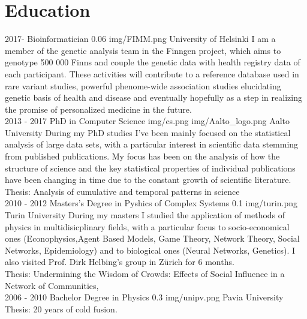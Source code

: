 \documentclass[]{friggeri-cv}
\begin{document}
\section{Education}
\begin{entrylist}
\unientry
{2017-}
{Bioinformatician}
{0.06}
{img/FIMM.png}
{University of Helsinki}
{I am a member of the genetic analysis team in the Finngen project, which aims to genotype 500 000 Finns and couple the genetic data with health registry data of each participant. These activities will contribute to a reference database used in rare variant studies, powerful phenome-wide association studies elucidating genetic basis of health and disease and eventually hopefully as a step in realizing the promise of personalized medicine in the future.}
\\

  \aaltoentry
    {2013 - 2017}
    {PhD in Computer Science}
{img/cs.png}
{img/Aalto_logo.png}
{Aalto University}
{During my PhD studies I've been mainly focused on the statistical analysis of large data sets, with a particular interest in
scientific data stemming from published publications. My focus has been on the analysis of how the structure of science and
the key statistical properties of individual publications have been changing in time due to the constant growth of scientific
literature.\\
Thesis: Analysis of cumulative and temporal patterns in science
}
\\

\unientry
    {2010 - 2012}
    {Masters's Degree in Pyshics of Complex Systems}
    {0.1}
   {img/turin.png}
    {Turin University}
    {During my masters I studied the application of methods of physics in multidisicplinary fields, with a particular focus
    to socio-economical ones (Econophysics,Agent Based Models, Game Theory, Network Theory, Social Networks, Epidemiology) and to biological ones
    (Neural Networks, Genetics). I also visited Prof. Dirk Helbing's group in Z\"urich for 6 months.\\
     Thesis: Undermining the Wisdom of Crowds: Effects of Social Influence in a Network of Communities,
}
\\
\unientry
    {2006 - 2010}
    {Bachelor Degree in Physics}
    {0.3}
    {img/unipv.png}
    {Pavia University}
{ Thesis: 20 years of cold fusion.}


\end{entrylist}
\end{document}
